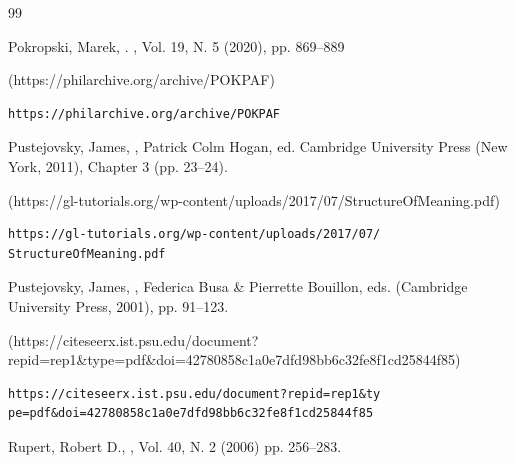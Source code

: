 \begin{thebibliography}{99}
{\begin{bItem}[MarekPokropski]
Pokropski, Marek,
.
,
Vol. 19, N. 5 (2020), pp. 869--889 
%
\begin{boxurl}(https://philarchive.org/archive/POKPAF)
\begin{lstlisting}
https://philarchive.org/archive/POKPAF
\end{lstlisting}
\end{boxurl}\end{bItem}







\begin{bItem}[JamesPustejovsky]
Pustejovsky, James, 
, 
Patrick Colm Hogan, ed. Cambridge University Press (New York, 2011),
Chapter 3 (pp. 23--24). 
%
\begin{boxurl}(https://gl-tutorials.org/wp-content/uploads/2017/07/StructureOfMeaning.pdf)
\begin{lstlisting}
https://gl-tutorials.org/wp-content/uploads/2017/07/
StructureOfMeaning.pdf
\end{lstlisting}
\end{boxurl}\end{bItem}


\begin{bItem}[PustejovskyType]
Pustejovsky, James, 
,  
Federica Busa \& Pierrette Bouillon, eds. (Cambridge University Press, 2001),
pp. 91--123. 
%
\begin{boxurl}(https://citeseerx.ist.psu.edu/document?repid=rep1&type=pdf&doi=42780858c1a0e7dfd98bb6c32fe8f1cd25844f85)
\begin{lstlisting}
https://citeseerx.ist.psu.edu/document?repid=rep1&ty
pe=pdf&doi=42780858c1a0e7dfd98bb6c32fe8f1cd25844f85
\end{lstlisting}
\end{boxurl}\end{bItem}




\begin{bItem}[RobertDRupert]
Rupert, Robert D.,  
,  
Vol. 40, N. 2 (2006) 
pp. 256--283. 
%
\end{bItem}


}
\end{thebibliography}
